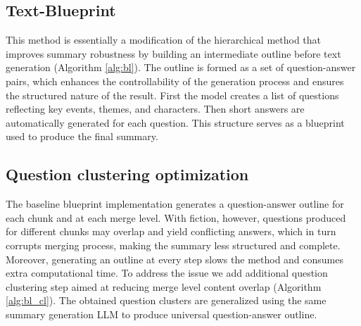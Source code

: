 \documentclass{superfri}
\begin{document}
\vspace{0.4em}
\subsection{Text-Blueprint}
This method \cite{blueprint} is essentially a modification of the hierarchical method 
that improves summary robustness by building an intermediate outline before text generation  (Algorithm \ref{alg:bl}).
The outline is formed as a set of question-answer pairs, which enhances the controllability of the generation process and ensures the structured nature of the result.
First the model creates a list of questions reflecting key events, themes, and characters. Then short answers are automatically generated for each question.
This structure serves as a blueprint used to produce the final summary.


\subsection{Question clustering optimization}
The baseline blueprint implementation generates a question-answer outline for each chunk and at each merge level. 
With fiction, however, questions produced for different chunks may overlap and yield conflicting answers, which in turn corrupts merging process, 
making the summary less structured and complete. 
Moreover, generating an outline at every step slows the method and consumes extra computational time.
To address the issue we add additional question clustering step aimed at reducing merge level content overlap  (Algorithm \ref{alg:bl_cl}). 
The obtained question clusters are generalized using the same summary generation LLM to produce universal question-answer outline.
\end{document}
